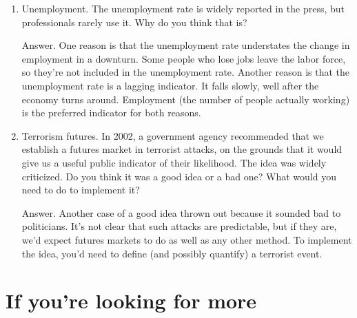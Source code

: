 \begin{enumerate}
\item Unemployment.  The unemployment rate is widely reported in the press,
but professionals rarely use it.  Why do you think that is?

Answer.
One reason is that the unemployment rate understates the
change in employment in a downturn.
Some people who lose jobs leave the labor force,
so they're not included in the unemployment rate.
Another reason is that the unemployment rate is a lagging
indicator.
It falls slowly, well after the economy turns around.
Employment (the number of people actually working) is
the preferred indicator for both reasons.

%

\item Terrorism futures.
In 2002, a government agency recommended that we establish a
futures market in terrorist attacks, on the grounds that it would
give us a useful public indicator of their likelihood.  The idea
was widely criticized.  Do you think it was a good idea or a bad
one?  What would you need to do to implement it?

Answer.  Another case of a good idea thrown out because it sounded
bad to politicians.  It's not clear that such attacks are predictable,
but if they are, we'd expect futures markets to do as well as any
other method.  To implement the idea, you'd need to define (and
possibly quantify) a terrorist event.
\end{enumerate}
\setlength{\leftmargini}{\oldleftmargini}

\section*{If you're looking for more}

